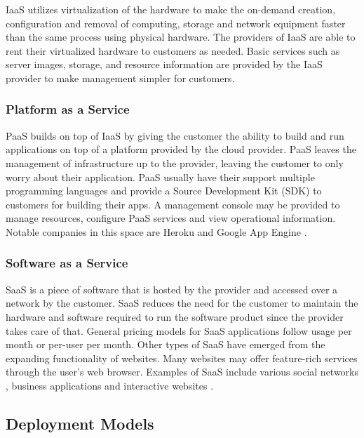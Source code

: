 \documentclass[fullapage,12pt]{article}
\begin{document}
IaaS utilizes virtualization of the hardware to make the on-demand creation, configuration and removal of computing, storage and network equipment faster than the same process using physical hardware. The providers of IaaS are able to rent their virtualized hardware to customers as needed. Basic services such as server images, storage, and resource information are provided by the IaaS provider to make management simpler for customers.

\subsubsection{Platform as a Service} \label{ssub:paas}

PaaS builds on top of IaaS by giving the customer the ability to build and run applications on top of a platform provided by the cloud provider. PaaS leaves the management of infrastructure up to the provider, leaving the customer to only worry about their application. PaaS usually have their support multiple programming languages and provide a Source Development Kit (SDK) to customers for building their apps. A management console may be provided to manage resources, configure PaaS services and view operational information. Notable companies in this space are Heroku \cite{heroku} and Google App Engine \cite{googleappengine}.

\subsubsection{Software as a Service} \label{ssub:saas}

SaaS is a piece of software that is hosted by the provider and accessed over a network by the customer. SaaS reduces the need for the customer to maintain the hardware and software required to run the software product since the provider takes care of that. General pricing models for SaaS applications follow usage per month or per-user per month. Other types of SaaS have emerged from the expanding functionality of websites. Many websites may offer feature-rich services through the user's web browser. Examples of SaaS include various social networks \cite{facebook}, business applications \cite{salesforce} and interactive websites \cite{netflix}.



\subsection{Deployment Models} \label{sub:deployment-model}
\end{document}
